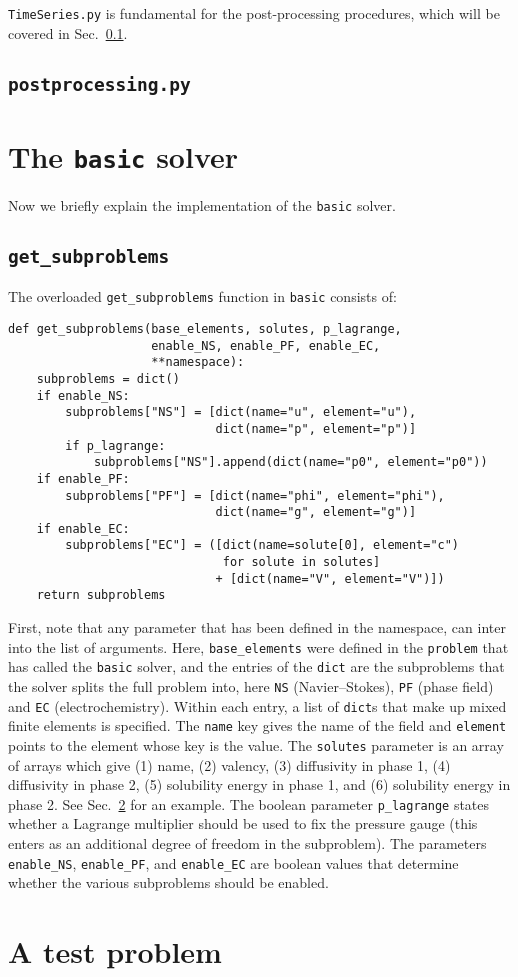 \documentclass[a4paper,10pt]{article}
\begin{document}
\texttt{TimeSeries.py} is fundamental for the post-processing procedures, which will be covered in Sec.\ \ref{sec:postproc}.

\subsection{\texttt{postprocessing.py}}
\label{sec:postproc}

\section{The \texttt{basic} solver}
\label{sec:basic_solver}
Now we briefly explain the implementation of the \texttt{basic} solver.

\subsection{\texttt{get\_subproblems}}
The overloaded \texttt{get\_subproblems} function in \texttt{basic} consists of:
\begin{verbatim}
def get_subproblems(base_elements, solutes, p_lagrange,
                    enable_NS, enable_PF, enable_EC,
                    **namespace):
    subproblems = dict()
    if enable_NS:
        subproblems["NS"] = [dict(name="u", element="u"),
                             dict(name="p", element="p")]
        if p_lagrange:
            subproblems["NS"].append(dict(name="p0", element="p0"))
    if enable_PF:
        subproblems["PF"] = [dict(name="phi", element="phi"),
                             dict(name="g", element="g")]
    if enable_EC:
        subproblems["EC"] = ([dict(name=solute[0], element="c")
                              for solute in solutes]
                             + [dict(name="V", element="V")])
    return subproblems
\end{verbatim}
First, note that any parameter that has been defined in the namespace, can inter into the list of arguments.
Here, \texttt{base\_elements} were defined in the \texttt{problem} that has called the \texttt{basic} solver, and the entries of the  \texttt{dict} are the subproblems that the solver splits the full problem into, here \texttt{NS} (Navier--Stokes), \texttt{PF} (phase field) and \texttt{EC} (electrochemistry).
Within each entry, a list of \texttt{dict}s that make up mixed finite elements is specified.
The \texttt{name} key gives the name of the field and \texttt{element} points to the element whose key is the value.
The \texttt{solutes} parameter is an array of arrays which give (1) name, (2) valency, (3) diffusivity in phase 1, (4) diffusivity in phase 2, (5) solubility energy in phase 1, and (6) solubility energy in phase 2.
See Sec.\ \ref{sec:test_problem} for an example.
The boolean parameter \texttt{p\_lagrange} states whether a Lagrange multiplier should be used to fix the pressure gauge (this enters as an additional degree of freedom in the subproblem).
The parameters \texttt{enable\_NS}, \texttt{enable\_PF}, and \texttt{enable\_EC} are boolean values that determine whether the various subproblems should be enabled.



\section{A test problem}
\label{sec:test_problem}



\end{document}
